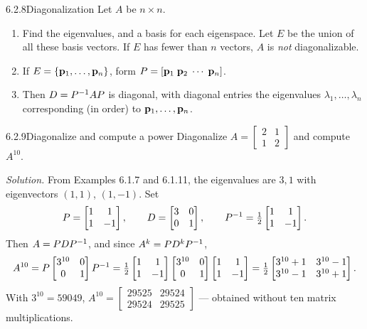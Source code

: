 \begin{algs}{6.2.8}{Diagonalization}
Let $A$ be $n\times n$.
\begin{enumerate}[label=\textup{(\roman*)},leftmargin=2.4em,itemsep=1pt]
\item Find the eigenvalues, and a basis for each eigenspace. Let $E$ be the union of all these basis vectors. If $E$ has fewer than $n$ vectors, $A$ is \emph{not} diagonalizable.
\item If $E=\{\mathbf{p}_1,\dots,\mathbf{p}_n\}$, form $P=[\mathbf{p}_1\;\mathbf{p}_2\;\cdots\;\mathbf{p}_n]$.
\item Then $D=P^{-1} AP$ is diagonal, with diagonal entries the eigenvalues $\lambda_1,\dots,\lambda_n$ corresponding (in order) to $\mathbf{p}_1,\dots,\mathbf{p}_n$.
\end{enumerate}
\end{algs}

\begin{exmp}{6.2.9}{Diagonalize and compute a power}
Diagonalize $A=\left[\begin{smallmatrix}2&1\\1&2\end{smallmatrix}\right]$ and compute $A^{10}$.

\smallskip
\noindent\textit{Solution.} From Examples 6.1.7 and 6.1.11, the eigenvalues are $3,1$ with eigenvectors $(1,1)$, $(1,-1)$. Set
\[
P=\begin{bmatrix}1&1\\1&-1\end{bmatrix},\qquad D=\begin{bmatrix}3&0\\0&1\end{bmatrix},\qquad P^{-1}=\tfrac12\begin{bmatrix}1&1\\1&-1\end{bmatrix}.
\]
Then $A=PDP^{-1}$, and since $A^k=PD^kP^{-1}$,
\[
A^{10}=P\begin{bmatrix}3^{10}&0\\0&1\end{bmatrix}P^{-1}=\tfrac12\begin{bmatrix}1&1\\1&-1\end{bmatrix}\begin{bmatrix}3^{10}&0\\0&1\end{bmatrix}\begin{bmatrix}1&1\\1&-1\end{bmatrix}=\tfrac12\begin{bmatrix}3^{10}+1&3^{10}-1\\3^{10}-1&3^{10}+1\end{bmatrix}.
\]
With $3^{10}=59049$, $A^{10}=\left[\begin{smallmatrix}29525&29524\\29524&29525\end{smallmatrix}\right]$ --- obtained without ten matrix multiplications.
\end{exmp}

